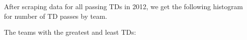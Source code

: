 \documentclass{article}
\begin{document}
After scraping data for all passing TDs in 2012, we get the following histogram for number of TD passes by team.


The teams with the greatest and least TDs:

\end{document}
